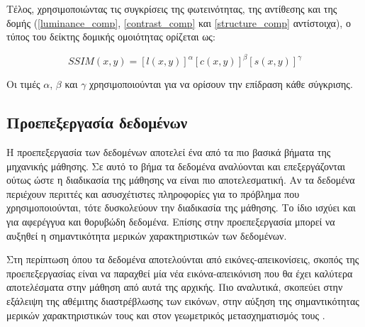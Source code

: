 \documentclass[a4paper,12pt]{article}
\begin{document}
Τέλος, χρησιμοποιώντας τις συγκρίσεις της φωτεινότητας, της αντίθεσης και της
δομής (\eqref{luminance_comp}, \eqref{contrast_comp} και \eqref{structure_comp}
αντίστοιχα), ο τύπος του δείκτης δομικής ομοιότητας ορίζεται ως:

\begin{equation} \label{eq:SSIM:1}
    SSIM(x,y) = \left[l(x,y)\right]^\alpha \left[c(x,y)\right]^\beta 
                \left[s(x,y)\right]^\gamma
\end{equation}

Οι τιμές $\alpha$, $\beta$ και $\gamma$ χρησιμοποιούνται για να ορίσουν την
επίδραση κάθε σύγκρισης.

\subsection{Προεπεξεργασία δεδομένων} \label{preprocessing:1}

Η προεπεξεργασία των δεδομένων αποτελεί ένα από τα πιο βασικά βήματα της
μηχανικής μάθησης. Σε αυτό το βήμα τα δεδομένα αναλύονται και επεξεργάζονται
ούτως ώστε η διαδικασία της μάθησης να είναι πιο αποτελεσματική. Αν τα δεδομένα
περιέχουν περιττές και ασυσχέτιστες πληροφορίες για το πρόβλημα που
χρησιμοποιούνται, τότε δυσκολεύουν την διαδικασία της μάθησης. Το ίδιο ισχύει
και για αφερέγγυα και θορυβώδη δεδομένα. Επίσης στην προεπεξεργασία μπορεί να
αυξηθεί η σημαντικότητα μερικών χαρακτηριστικών των δεδομένων.

Στη περίπτωση όπου τα δεδομένα αποτελούνται από εικόνες-απεικονίσεις, σκοπός της
προεπεξεργασίας είναι να παραχθεί μία νέα εικόνα-απεικόνιση που θα έχει καλύτερα
αποτελέσματα στην μάθηση από αυτά της αρχικής. Πιο αναλυτικά, σκοπεύει στην
εξάλειψη της αθέμιτης διαστρέβλωσης των εικόνων, στην αύξηση της σημαντικότητας
μερικών χαρακτηριστικών τους και στον γεωμετρικός μετασχηματισμός τους
\cite{Image_preprocessing:1}.

\end{document}

